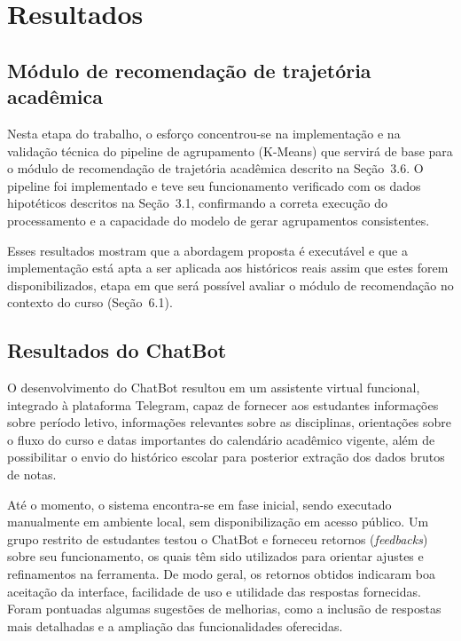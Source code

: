 \section{Resultados}

\subsection{Módulo de recomendação de trajetória acadêmica}
\label{sec:resultados_algoritmo}

Nesta etapa do trabalho, o esforço concentrou-se na implementação e na validação técnica do pipeline de agrupamento (K-Means) que servirá de base para o módulo de recomendação de trajetória acadêmica descrito na Seção~3.6. O pipeline foi implementado e teve seu funcionamento verificado com os dados hipotéticos descritos na Seção~3.1, confirmando a correta execução do processamento e a capacidade do modelo de gerar agrupamentos consistentes.

Esses resultados mostram que a abordagem proposta é executável e que a implementação está apta a ser aplicada aos históricos reais assim que estes forem disponibilizados, etapa em que será possível avaliar o módulo de recomendação no contexto do curso (Seção~6.1).

\subsection{Resultados do ChatBot}
\label{sec:resultados_chatbot}

O desenvolvimento do ChatBot resultou em um assistente virtual funcional, 
integrado à plataforma Telegram, capaz de fornecer aos estudantes informações 
sobre período letivo, informações relevantes sobre as disciplinas, orientações sobre o fluxo do curso e datas importantes do calendário acadêmico vigente, além de possibilitar o envio do histórico escolar para posterior extração dos dados brutos de notas.

Até o momento, o sistema encontra-se em fase inicial, sendo executado manualmente 
em ambiente local, sem disponibilização em acesso público. Um grupo restrito de 
estudantes testou o ChatBot e forneceu retornos (\textit{feedbacks}) sobre seu 
funcionamento, os quais têm sido utilizados para orientar ajustes e refinamentos 
na ferramenta. De modo geral, os retornos obtidos indicaram boa aceitação da 
interface, facilidade de uso e utilidade das respostas fornecidas. Foram pontuadas algumas sugestões de melhorias, como a inclusão de respostas mais detalhadas e a ampliação das funcionalidades oferecidas.